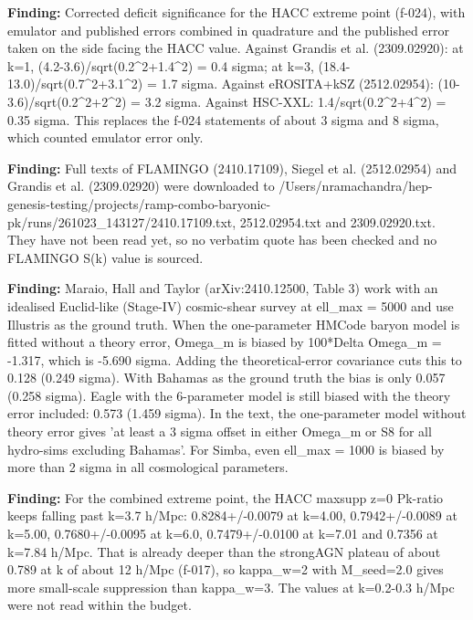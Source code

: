 \documentclass[11pt,a4paper]{article}
\begin{document}
\textbf{Finding:} Corrected deficit significance for the HACC extreme point (f-024), with emulator and published errors combined in quadrature and the published error taken on the side facing the HACC value. Against Grandis et al. (2309.02920): at k=1, (4.2-3.6)/sqrt(0.2\textasciicircum{}2+1.4\textasciicircum{}2) = 0.4 sigma; at k=3, (18.4-13.0)/sqrt(0.7\textasciicircum{}2+3.1\textasciicircum{}2) = 1.7 sigma. Against eROSITA+kSZ (2512.02954): (10-3.6)/sqrt(0.2\textasciicircum{}2+2\textasciicircum{}2) = 3.2 sigma. Against HSC-XXL: 1.4/sqrt(0.2\textasciicircum{}2+4\textasciicircum{}2) = 0.35 sigma. This replaces the f-024 statements of about 3 sigma and 8 sigma, which counted emulator error only.

\textbf{Finding:} Full texts of FLAMINGO (2410.17109), Siegel et al. (2512.02954) and Grandis et al. (2309.02920) were downloaded to /Users/nramachandra/hep-genesis-testing/projects/ramp-combo-baryonic-pk/runs/261023\_143127/2410.17109.txt, 2512.02954.txt and 2309.02920.txt. They have not been read yet, so no verbatim quote has been checked and no FLAMINGO S(k) value is sourced.

\textbf{Finding:} Maraio, Hall and Taylor (arXiv:2410.12500, Table 3) work with an idealised Euclid-like (Stage-IV) cosmic-shear survey at ell\_max = 5000 and use Illustris as the ground truth. When the one-parameter HMCode baryon model is fitted without a theory error, Omega\_m is biased by 100*Delta Omega\_m = -1.317, which is -5.690 sigma. Adding the theoretical-error covariance cuts this to 0.128 (0.249 sigma). With Bahamas as the ground truth the bias is only 0.057 (0.258 sigma). Eagle with the 6-parameter model is still biased with the theory error included: 0.573 (1.459 sigma). In the text, the one-parameter model without theory error gives 'at least a 3 sigma offset in either Omega\_m or S8 for all hydro-sims excluding Bahamas'. For Simba, even ell\_max = 1000 is biased by more than 2 sigma in all cosmological parameters.

\textbf{Finding:} For the combined extreme point, the HACC maxsupp z=0 Pk-ratio keeps falling past k=3.7 h/Mpc: 0.8284+/-0.0079 at k=4.00, 0.7942+/-0.0089 at k=5.00, 0.7680+/-0.0095 at k=6.0, 0.7479+/-0.0100 at k=7.01 and 0.7356 at k=7.84 h/Mpc. That is already deeper than the strongAGN plateau of about 0.789 at k of about 12 h/Mpc (f-017), so kappa\_w=2 with M\_seed=2.0 gives more small-scale suppression than kappa\_w=3. The values at k=0.2-0.3 h/Mpc were not read within the budget.
\end{document}
